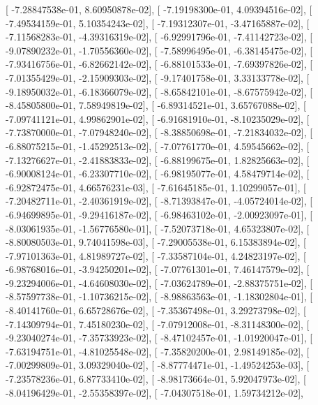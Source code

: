 \documentclass{article}
\begin{document}
       [ -7.28847538e-01,   8.60950878e-02],
       [ -7.19198300e-01,   4.09394516e-02],
       [ -7.49534159e-01,   5.10354243e-02],
       [ -7.19312307e-01,  -3.47165887e-02],
       [ -7.11568283e-01,  -4.39316319e-02],
       [ -6.92991796e-01,  -7.41142723e-02],
       [ -9.07890232e-01,  -1.70556360e-02],
       [ -7.58996495e-01,  -6.38145475e-02],
       [ -7.93416756e-01,  -6.82662142e-02],
       [ -6.88101533e-01,  -7.69397826e-02],
       [ -7.01355429e-01,  -2.15909303e-02],
       [ -9.17401758e-01,   3.33133778e-02],
       [ -9.18950032e-01,  -6.18366079e-02],
       [ -8.65842101e-01,  -8.67575942e-02],
       [ -8.45805800e-01,   7.58949819e-02],
       [ -6.89314521e-01,   3.65767088e-02],
       [ -7.09741121e-01,   4.99862901e-02],
       [ -6.91681910e-01,  -8.10235029e-02],
       [ -7.73870000e-01,  -7.07948240e-02],
       [ -8.38850698e-01,  -7.21834032e-02],
       [ -6.88075215e-01,  -1.45292513e-02],
       [ -7.07761770e-01,   4.59545662e-02],
       [ -7.13276627e-01,  -2.41883833e-02],
       [ -6.88199675e-01,   1.82825663e-02],
       [ -6.90008124e-01,  -6.23307710e-02],
       [ -6.98195077e-01,   4.58479714e-02],
       [ -6.92872475e-01,   4.66576231e-03],
       [ -7.61645185e-01,   1.10299057e-01],
       [ -7.20482711e-01,  -2.40361919e-02],
       [ -8.71393847e-01,  -4.05724014e-02],
       [ -6.94699895e-01,  -9.29416187e-02],
       [ -6.98463102e-01,  -2.00923097e-01],
       [ -8.03061935e-01,  -1.56776580e-01],
       [ -7.52073718e-01,   4.65323807e-02],
       [ -8.80080503e-01,   9.74041598e-03],
       [ -7.29005538e-01,   6.15383894e-02],
       [ -7.97101363e-01,   4.81989727e-02],
       [ -7.33587104e-01,   4.24823197e-02],
       [ -6.98768016e-01,  -3.94250201e-02],
       [ -7.07761301e-01,   7.46147579e-02],
       [ -9.23294006e-01,  -4.64608030e-02],
       [ -7.03624789e-01,  -2.88375751e-02],
       [ -8.57597738e-01,  -1.10736215e-02],
       [ -8.98863563e-01,  -1.18302804e-01],
       [ -8.40141760e-01,   6.65728676e-02],
       [ -7.35367498e-01,   3.29273798e-02],
       [ -7.14309794e-01,   7.45180230e-02],
       [ -7.07912008e-01,  -8.31148300e-02],
       [ -9.23040274e-01,  -7.35733923e-02],
       [ -8.47102457e-01,  -1.01920047e-01],
       [ -7.63194751e-01,  -4.81025548e-02],
       [ -7.35820200e-01,   2.98149185e-02],
       [ -7.00299809e-01,   3.09329040e-02],
       [ -8.87774471e-01,  -1.49524253e-03],
       [ -7.23578236e-01,   6.87733410e-02],
       [ -8.98173664e-01,   5.92047973e-02],
       [ -8.04196429e-01,  -2.55358397e-02],
       [ -7.04307518e-01,   1.59734212e-02],
\end{document}
